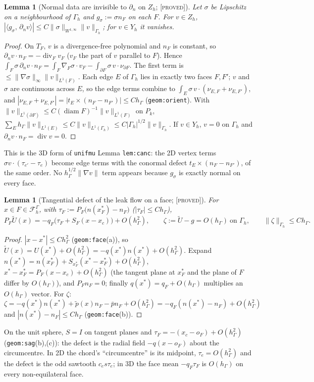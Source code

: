 \documentclass[11pt,reqno]{amsart}
\theoremstyle{plain}
\newtheorem{lemma}[theorem]{Lemma}
\theoremstyle{definition}
\newcommand{\status}[1]{\textup{\textsc{[#1]}}}
\newcommand{\hG}{h_\Gamma}
\newcommand{\Gh}{\Gamma_h}
\newcommand{\FG}{\mathcal F_h^\Gamma}
\newcommand{\Zh}{Z_h}
\newcommand{\dn}{\partial_n}
\newcommand{\pt}{\tilde p}
\newcommand{\pbar}{\bar p}
\newcommand{\ip}[2]{\langle #1,\, #2\rangle}
\newcommand{\norm}[1]{\lVert #1\rVert}
\renewcommand{\div}{\operatorname{div}}
\newcommand{\Ut}{\tilde U}
\newcommand{\Yh}{Y_h}
\DeclareMathOperator{\diam}{diam}
\begin{document}
\begin{lemma}[Normal data are invisible to $\dn$ on $\Zh$; \status{proved}]\label{A:canc}
Let $\sigma$ be Lipschitz on a neighbourhood of $\Gh$ and $g_\sigma:=\sigma n_F$ on each $F$. For $v\in\Zh$, $|\ip{g_\sigma}{\dn v}|\le C\norm\sigma_{W^{1,\infty}}\norm v_{\Gh}$; for $v\in\Yh$ it vanishes.
\end{lemma}
\begin{proof}
On $T_F$, $v$ is a divergence-free polynomial and $n_F$ is constant, so $\dn v\cdot n_F=-\div_Fv_F$ ($v_F$ the part of $v$ parallel to $F$). Hence $\int_F\sigma\,\dn v\cdot n_F=\int_F\nabla_F\sigma\cdot v_F-\int_{\partial F}\sigma\,v\cdot\nu_{\partial F}$. The first term is $\le\norm{\nabla\sigma}_\infty\norm v_{L^1(F)}$. Each edge $E$ of $\Gh$ lies in exactly two faces $F,F'$; $v$ and $\sigma$ are continuous across $E$, so the edge terms combine to $\int_E\sigma\,v\cdot(\nu_{E,F}+\nu_{E,F'})$, and $|\nu_{E,F}+\nu_{E,F'}|=|t_E\times(n_F-n_{F'})|\le C\hG$ (\texttt{geom:orient}). With $\norm v_{L^1(\partial F)}\le C(\diam F)^{-1}\norm v_{L^1(F)}$ on $P_k$, $\sum_E\hG\norm v_{L^1(E)}\le C\norm v_{L^1(\Gh)}\le C|\Gh|^{1/2}\norm v_{\Gh}$. If $v\in\Yh$, $v=0$ on $\Gh$ and $\dn v\cdot n_F=\div v=0$.
\end{proof}
This is the 3D form of \texttt{unifmu} Lemma \texttt{lem:canc}: the 2D vertex terms $\sigma v\cdot(\tau_{e'}-\tau_e)$ become edge terms with the conormal defect $t_E\times(n_F-n_{F'})$, of the same order. No $\hG^{1/2}\norm{\nabla v}$ term appears because $g_\sigma$ is exactly normal on every face.

\begin{lemma}[Tangential defect of the leak flow on a face; \status{proved}]\label{A:defect}
For $x\in F\in\FG$, with $\tau_F:=P_F\bigl(n(x^\ast_F)-n_F\bigr)$ ($|\tau_F|\le C\hG$),
\[
P_F\Ut(x)=-q_F\bigl(\tau_F+S_F(x-x_c)\bigr)+O(\hG^2),\qquad \zeta:=\Ut-g=O(\hG)\ \text{on }\Gh,\qquad \norm\zeta_{\Gh}\le C\hG .
\]
\end{lemma}
\begin{proof}
$|x-x^\ast|\le C\hG^2$ (\texttt{geom:face}(a)), so $\Ut(x)=U(x^\ast)+O(\hG^2)=-q(x^\ast)n(x^\ast)+O(\hG^2)$. Expand $n(x^\ast)=n(x^\ast_F)+S_{x^\ast_F}(x^\ast-x^\ast_F)+O(\hG^2)$, $x^\ast-x^\ast_F=P_F(x-x_c)+O(\hG^2)$ (the tangent plane at $x^\ast_F$ and the plane of $F$ differ by $O(\hG)$), and $P_Fn_F=0$; finally $q(x^\ast)=q_F+O(\hG)$ multiplies an $O(\hG)$ vector. For $\zeta$: $\zeta=-q(x^\ast)n(x^\ast)+\pt(x)n_F-\pbar n_F+O(\hG^2)=-q_F(n(x^\ast)-n_F)+O(\hG^2)$ and $|n(x^\ast)-n_F|\le C\hG$ (\texttt{geom:face}(b)).
\end{proof}
On the unit sphere, $S=I$ on tangent planes and $\tau_F=-(x_c-o_F)+O(\hG^2)$ (\texttt{geom:sag}(b),(c)): the defect is the radial field $-q(x-o_F)$ about the circumcentre. In 2D the chord's ``circumcentre'' is its midpoint, $\tau_e=O(\hG^2)$ and the defect is the odd sawtooth $c_es\tau_e$; in 3D the face mean $-q_F\tau_F$ is $O(\hG)$ on every non-equilateral face.
\end{document}

